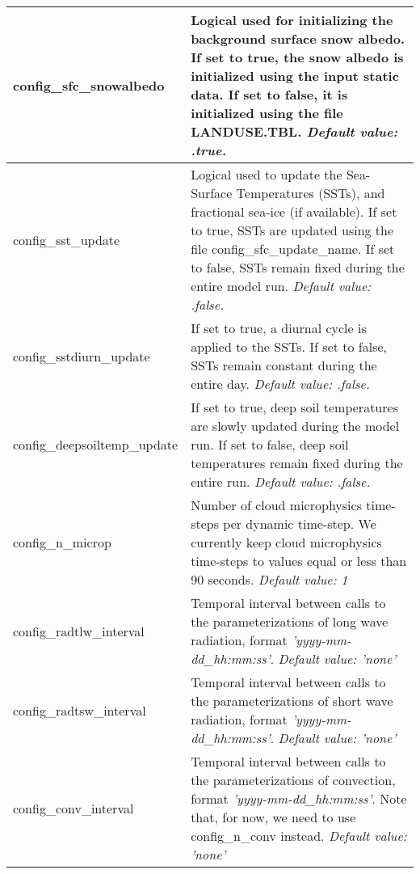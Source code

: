 {\begin{longtable}{|p{2.0in} |p{4.25in}|}
    config\_sfc\_snowalbedo & Logical used for initializing the background surface snow albedo. If set to true, the snow albedo is initialized using the input static data. 
    If set to false, it is initialized using the file LANDUSE.TBL.\newline 
  {\em Default value: .true.} \\ \hline

  config\_sst\_update & Logical used to update the Sea-Surface Temperatures (SSTs), and fractional sea-ice (if available). If set to true, SSTs are updated using the file config\_sfc\_update\_name. If set to false, SSTs remain fixed during the entire model run. \newline 
  {\em Default value: .false.} \\ \hline

  config\_sstdiurn\_update & If set to true, a diurnal cycle is applied to the SSTs. If set to false, SSTs remain constant during the entire day.\newline 
  {\em Default value: .false.} \\ \hline

  config\_deepsoiltemp\_update & If set to true, deep soil temperatures are slowly updated during the model run. If set to false, deep soil temperatures remain fixed during the entire run. \newline 
  {\em Default value: .false.} \\ \hline

  config\_n\_microp & Number of cloud microphysics time-steps per dynamic time-step. We currently keep cloud microphysics time-steps to values equal or less than 90 seconds. \newline 
  {\em Default value: 1} \\ \hline
  
  config\_radtlw\_interval & Temporal interval between calls to the parameterizations of long wave radiation, format {\em 'yyyy-mm-dd\_hh:mm:ss'}. \newline 
  {\em Default value: 'none'} \\ \hline

  config\_radtsw\_interval & Temporal interval between calls to the parameterizations of short wave radiation, format {\em 'yyyy-mm-dd\_hh:mm:ss'}. \newline 
  {\em Default value: 'none'} \\ \hline

 config\_conv\_interval & Temporal interval between calls to the parameterizations of convection, format {\em 'yyyy-mm-dd\_hh:mm:ss'}. Note that, for now, we need to use config\_n\_conv instead. \newline
  {\em Default value: 'none'} \\ \hline


\end{longtable}}
